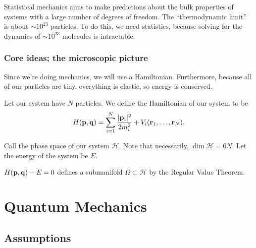 \documentclass[11pt]{article}
\begin{document}
Statistical mechanics aims to make predictions about the bulk properties
of systems with a large number of degrees of freedom. The ``thermodynamic
limit'' is about $\sim 10^{23}$ particles.  To do this, we need statistics, 
because solving for the dynamics of $\sim 10^{23}$ molecules is intractable.

\subsubsection{Core ideas; the microscopic picture}

Since we're doing mechanics, we will use a Hamiltonian. Furthermore,
because all of our particles are tiny, everything is elastic, so energy
is conserved.

\begin{definition}
    Let our system have $N$ particles. We define the Hamiltonian of our system to be
    \begin{align*}
        H(\mathbf{p}, \mathbf{q}) = \sum_{i = 1}^{N} \frac{|\mathbf{p}_i|^2}{2m_i^2} + V_i(\mathbf{r}_1, \ldots, \mathbf{r}_{N}).
    \end{align*}
\end{definition}

\begin{definition}
    Call the phase space of our system $\mathcal{H}$. Note that necessarily,
    $\dim{\mathcal{H}} = 6N$. Let the energy of the system be $E$.
\end{definition}

$H(\mathbf{p}, \mathbf{q}) - E = 0$ defines a submanifold $\Omega \subset \mathcal{H}$
by the Regular Value Theorem.
\newpage

\section{Quantum Mechanics}

\subsection{Assumptions}
\end{document}
